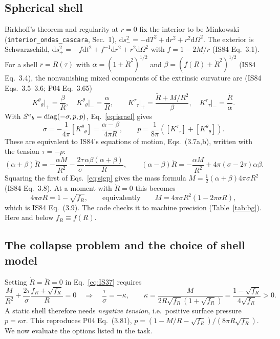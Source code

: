 \documentclass[11pt,a4paper]{article}
\numberwithin{equation}{section}
\newcommand{\sq}{\sqrt{f_R}}
\newcommand{\dd}{\mathrm{d}}
\begin{document}
\subsection{Spherical shell}
Birkhoff's theorem and regularity at $r=0$ fix the interior to be Minkowski
(\texttt{interior\_ondas\_cascara}, Sec.~1), $\dd s_-^2=-\dd T^2+\dd r^2+r^2\dd\Omega^2$. The exterior is
Schwarzschild, $\dd s_+^2=-f\dd t^2+f^{-1}\dd r^2+r^2\dd\Omega^2$ with $f=1-2M/r$ (IS84 Eq.~3.1). For a shell
$r=R(\tau)$ with $\alpha=(1+\dot R^2)^{1/2}$ and $\beta=(f(R)+\dot R^2)^{1/2}$ (IS84 Eq.~3.4), the
nonvanishing mixed components of the extrinsic curvature are (IS84 Eqs.~3.5--3.6; P04 Eq.~3.65)
\begin{equation}
K^\theta{}_\theta\big|_+=\frac{\beta}{R},\quad K^\theta{}_\theta\big|_-=\frac{\alpha}{R},\qquad
K^\tau{}_\tau\big|_+=\frac{\ddot R+M/R^2}{\beta},\quad K^\tau{}_\tau\big|_-=\frac{\ddot R}{\alpha}.
\label{eq:Kbg}
\end{equation}
With $S^a{}_b={\rm diag}(-\sigma,p,p)$, Eq.~\eqref{eq:israel} gives
\begin{equation}
\sigma=-\frac{1}{4\pi}[K^\theta{}_\theta]=\frac{\alpha-\beta}{4\pi R},\qquad
p=\frac{1}{8\pi}\left([K^\tau{}_\tau]+[K^\theta{}_\theta]\right).
\label{eq:sigp}
\end{equation}
These are equivalent to IS84's equations of motion, Eqs.~(3.7a,b), written with the tension $\tau=-p$:
\begin{equation}
(\alpha+\beta)\ddot R=-\frac{\alpha M}{R^2}-\frac{2\tau}{\sigma}\frac{\alpha\beta(\alpha+\beta)}{R},\qquad
(\alpha-\beta)\ddot R=-\frac{\alpha M}{R^2}+4\pi(\sigma-2\tau)\alpha\beta .
\label{eq:IS37}
\end{equation}
Squaring the first of Eqs.~\eqref{eq:sigp} gives the mass formula $M=\tfrac12(\alpha+\beta)4\pi\sigma R^2$
(IS84 Eq.~3.8). At a moment with $\dot R=0$ this becomes
\begin{equation}
4\pi\sigma R=1-\sq,\qquad\text{equivalently}\qquad M=4\pi\sigma R^2(1-2\pi\sigma R),
\label{eq:IS39}
\end{equation}
which is IS84 Eq.~(3.9). The code checks it to machine precision (Table~\ref{tab:bg}). Here and below
$f_R\equiv f(R)$.

\subsection{The collapse problem and the choice of shell model}\label{sec:choice}
Setting $\dot R=\ddot R=0$ in Eq.~\eqref{eq:IS37} requires
\begin{equation}
\frac{M}{R^2}+\frac{2\tau}{\sigma}\frac{f_R+\sq}{R}=0\quad\Longrightarrow\quad
\frac{\tau}{\sigma}=-\kappa,\qquad \kappa=\frac{M}{2R\sq(1+\sq)}=\frac{1-\sq}{4\sq}>0 .
\label{eq:kappa}
\end{equation}
A static shell therefore needs \emph{negative tension}, i.e.\ positive surface pressure $p=\kappa\sigma$.
This reproduces P04 Eq.~(3.81), $p=(1-M/R-\sq)/(8\pi R\sq)$. We now evaluate the options listed in the
task.
\end{document}

